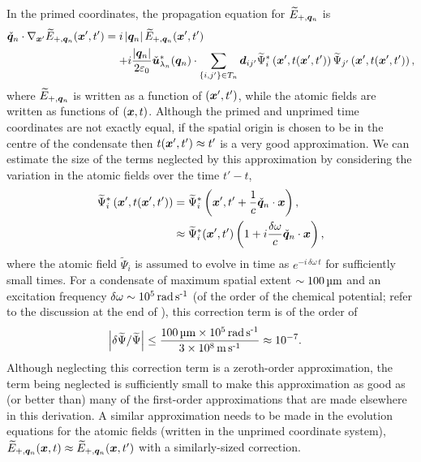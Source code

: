 In the primed coordinates, the propagation equation for $\widetilde{E}_{+, \bm{q}_n}$ is
\begin{align}
    \label{OpticalPumping:ElectricFieldSpatialPropagation}
  \begin{split}
    \unitvec{q}_n \cdot \nabla_{\vect{x}'} \widetilde{E}_{+, \vect{q}_n}(\vect{x}', t') &= i \abs{\vect{q}_n} \widetilde{E}_{+, \vect{q}_n}(\vect{x}', t')\\
    &\relphantom{=} + i \frac{\abs{\vect{q}_n}}{2 \varepsilon_0} \unitvec{u}^*_{\lambda_n}(\vect{q}_n) \cdot \sum_{\{i,j'\}\in T_n} \vect{d}_{ij'} \widetilde{\Psi}^*_i\left(\vect{x}', t(\vect{x}', t')\right) \widetilde{\Psi}_{j'}\left(\vect{x}', t(\vect{x}', t')\right),
  \end{split}
\end{align}
where $\widetilde{E}_{+, \bm{q}_n}$ is written as a function of $(\bm{x}', t')$, while the atomic fields are written as functions of $(\bm{x}, t)$.  Although the primed and unprimed time coordinates are not exactly equal, if the spatial origin is chosen to be in the centre of the condensate then $t(\bm{x}', t') \approx t'$ is a very good approximation.  We can estimate the size of the terms neglected by this approximation by considering the variation in the atomic fields over the time $t'-t$,
\begin{align}
    \widetilde{\Psi}^*_i\left(\bm{x}', t(\bm{x}', t')\right) &= \widetilde{\Psi}^*_i\left(\bm{x}', t' + \frac{1}{c} \check{\bm{q}}_n \cdot \bm{x} \right), \notag\\
    &\approx \widetilde{\Psi}^*_i(\bm{x}', t') \left(1 + i  \frac{\delta \omega}{c}\check{\bm{q}}_n \cdot \bm{x} \right),
\end{align}
where the atomic field $\widetilde{\Psi}_{i}$ is assumed to evolve in time as $e^{-i\, \delta\omega\, t}$ for sufficiently small times.  For a condensate of maximum spatial extent $\sim \unit[100]{\micro m}$ and an excitation frequency $\delta \omega\sim \unit[10^5]{rad\,s\textsuperscript{-1}}$ (of the order of the chemical potential; refer to the discussion at the end of ), this correction term is of the order of
\begin{align}
    \abs{\delta \widetilde{\Psi} / \widetilde{\Psi}} &\leq \frac{\unit[100]{\micro m} \times \unit[10^{5}]{rad\,s\textsuperscript{-1}}}{3 \times \unit[10^8]{m\,s\textsuperscript{-1}}} \approx 10^{-7}.
\end{align}
Although neglecting this correction term is a zeroth-order approximation, the term being neglected is sufficiently small to make this approximation as good as (or better than) many of the first-order approximations that are made elsewhere in this derivation.  A similar approximation needs to be made in the evolution equations for the atomic fields (written in the unprimed coordinate system), $\widetilde{E}_{+, \bm{q}_n}(\bm{x}, t) \approx \widetilde{E}_{+, \bm{q}_n}(\bm{x}, t')$ with a similarly-sized correction.  

